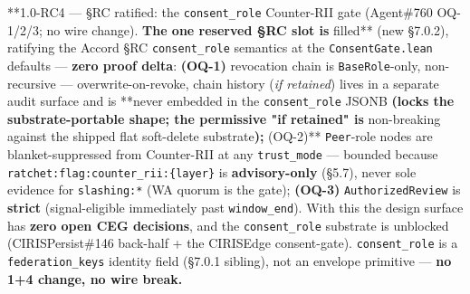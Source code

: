 \documentclass[10pt]{article}
\begin{document}
**1.0-RC4 — §RC ratified: the \texttt{consent\_role} Counter-RII gate (Agent\#760 OQ-1/2/3; no wire change).\textbf{ The one reserved §RC slot is }filled** (new §7.0.2), ratifying the Accord §RC \texttt{consent\_role} semantics at the \texttt{ConsentGate.lean} defaults — \textbf{zero proof delta}: \textbf{(OQ-1)} revocation chain is \texttt{BaseRole}-only, non-recursive — overwrite-on-revoke, chain history (\textit{if retained}) lives in a separate audit surface and is **never embedded in the \texttt{consent\_role} JSONB\textbf{ (locks the substrate-portable shape; the permissive "if retained" is }non-breaking against the shipped flat soft-delete substrate\textbf{); }(OQ-2)** \texttt{Peer}-role nodes are blanket-suppressed from Counter-RII at any \texttt{trust\_mode} — bounded because \texttt{ratchet:flag:counter\_rii:\{layer\}} is \textbf{advisory-only} (§5.7), never sole evidence for \texttt{slashing:*} (WA quorum is the gate); \textbf{(OQ-3)} \texttt{AuthorizedReview} is \textbf{strict} (signal-eligible immediately past \texttt{window\_end}). With this the design surface has \textbf{zero open CEG decisions}, and the \texttt{consent\_role} substrate is unblocked (CIRISPersist\#146 back-half + the CIRISEdge consent-gate). \texttt{consent\_role} is a \texttt{federation\_keys} identity field (§7.0.1 sibling), not an envelope primitive — \textbf{no 1+4 change, no wire break.}
\end{document}
